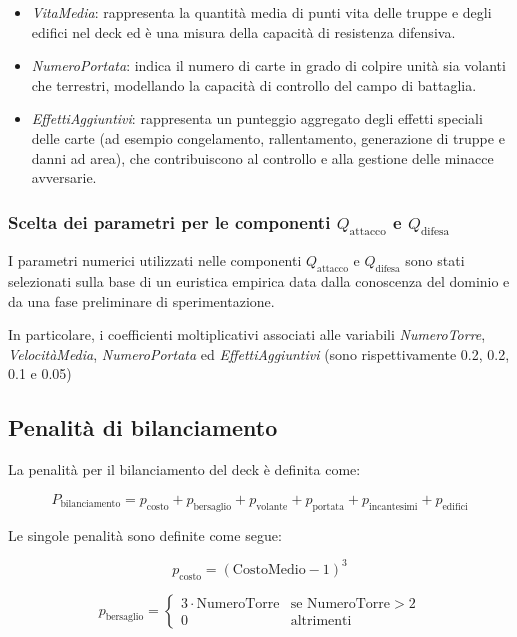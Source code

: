 \documentclass{article}
\begin{document}
\begin{itemize}
    \item \textit{VitaMedia}: rappresenta la quantità media di punti vita delle truppe e degli edifici nel deck ed è una misura della capacità di resistenza difensiva.
    \item \textit{NumeroPortata}: indica il numero di carte in grado di colpire unità sia volanti che terrestri, modellando la capacità di controllo del campo di battaglia.
    \item \textit{EffettiAggiuntivi}: rappresenta un punteggio aggregato degli effetti speciali delle carte (ad esempio congelamento, rallentamento, generazione di truppe e danni ad area), che contribuiscono al controllo e alla gestione delle minacce avversarie.
\end{itemize}

\subsubsection{Scelta dei parametri per le componenti $Q_{\text{attacco}}$ e $Q_{\text{difesa}}$}

I parametri numerici utilizzati nelle componenti $Q_{\text{attacco}}$ e $Q_{\text{difesa}}$ sono stati selezionati sulla base di un euristica empirica data dalla  conoscenza del dominio e da una fase preliminare di sperimentazione.

In particolare, i coefficienti moltiplicativi associati alle variabili \textit{NumeroTorre}, \textit{VelocitàMedia}, \textit{NumeroPortata} ed \textit{EffettiAggiuntivi} (sono rispettivamente 0.2, 0.2, 0.1 e 0.05) 

\subsection{Penalità di bilanciamento}

La penalità per il bilanciamento del deck è definita come:

\[
P_{\text{bilanciamento}} = p_{\text{costo}} + p_{\text{bersaglio}} + p_{\text{volante}} + p_{\text{portata}} + p_{\text{incantesimi}} + p_{\text{edifici}}
\]

Le singole penalità sono definite come segue:

\[
p_{\text{costo}} = (\text{CostoMedio} - 1)^3
\]

\[
p_{\text{bersaglio}} =
\begin{cases}
3 \cdot \text{NumeroTorre} & \text{se } \text{NumeroTorre} > 2 \\
0 & \text{altrimenti}
\end{cases}
\]
\end{document}
